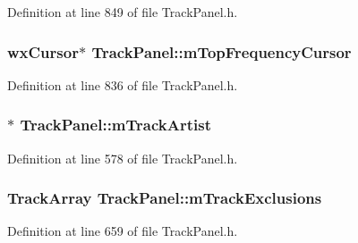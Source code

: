 Definition at line 849 of file Track\+Panel.\+h.

\subsubsection[{\texorpdfstring{m\+Top\+Frequency\+Cursor}{mTopFrequencyCursor}}]{\setlength{\rightskip}{0pt plus 5cm}wx\+Cursor$\ast$ Track\+Panel\+::m\+Top\+Frequency\+Cursor\hspace{0.3cm}{\ttfamily [protected]}}\hypertarget{class_track_panel_a870e2ab664262b1033b6ab96acc82c02}{}\label{class_track_panel_a870e2ab664262b1033b6ab96acc82c02}


Definition at line 836 of file Track\+Panel.\+h.

\subsubsection[{\texorpdfstring{m\+Track\+Artist}{mTrackArtist}}]{$\ast$ Track\+Panel\+::m\+Track\+Artist\hspace{0.3cm}{\ttfamily [protected]}}\hypertarget{class_track_panel_a5b09b33be61ef200636b5513b45d2285}{}\label{class_track_panel_a5b09b33be61ef200636b5513b45d2285}


Definition at line 578 of file Track\+Panel.\+h.

\subsubsection[{\texorpdfstring{m\+Track\+Exclusions}{mTrackExclusions}}]{\setlength{\rightskip}{0pt plus 5cm}Track\+Array Track\+Panel\+::m\+Track\+Exclusions\hspace{0.3cm}{\ttfamily [protected]}}\hypertarget{class_track_panel_a04816694a363342378cae5293114b5d2}{}\label{class_track_panel_a04816694a363342378cae5293114b5d2}


Definition at line 659 of file Track\+Panel.\+h.

